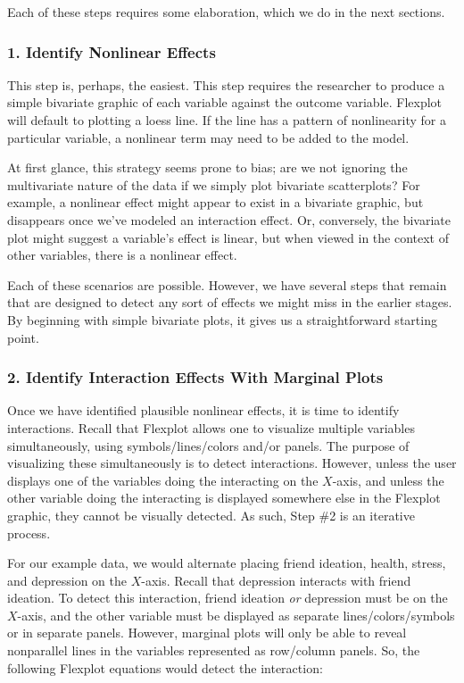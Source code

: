 \documentclass[
  man,floatsintext]{apa6}
\begin{document}
Each of these steps requires some elaboration, which we do in the next sections.

\subsubsection{1. Identify Nonlinear Effects}\label{identify-nonlinear-effects}

This step is, perhaps, the easiest. This step requires the researcher to produce a simple bivariate graphic of each variable against the outcome variable. Flexplot will default to plotting a loess line. If the line has a pattern of nonlinearity for a particular variable, a nonlinear term may need to be added to the model.

At first glance, this strategy seems prone to bias; are we not ignoring the multivariate nature of the data if we simply plot bivariate scatterplots? For example, a nonlinear effect might appear to exist in a bivariate graphic, but disappears once we've modeled an interaction effect. Or, conversely, the bivariate plot might suggest a variable's effect is linear, but when viewed in the context of other variables, there is a nonlinear effect.

Each of these scenarios are possible. However, we have several steps that remain that are designed to detect any sort of effects we might miss in the earlier stages. By beginning with simple bivariate plots, it gives us a straightforward starting point.

\subsubsection{2. Identify Interaction Effects With Marginal Plots}\label{identify-interaction-effects-with-marginal-plots}

Once we have identified plausible nonlinear effects, it is time to identify interactions. Recall that Flexplot allows one to visualize multiple variables simultaneously, using symbols/lines/colors and/or panels. The purpose of visualizing these simultaneously is to detect interactions. However, unless the user displays one of the variables doing the interacting on the \(X\)-axis, and unless the other variable doing the interacting is displayed somewhere else in the Flexplot graphic, they cannot be visually detected. As such, Step \#2 is an iterative process.

For our example data, we would alternate placing friend ideation, health, stress, and depression on the \(X\)-axis. Recall that depression interacts with friend ideation. To detect this interaction, friend ideation \emph{or} depression must be on the \(X\)-axis, and the other variable must be displayed as separate lines/colors/symbols or in separate panels. However, marginal plots will only be able to reveal nonparallel lines in the variables represented as row/column panels. So, the following Flexplot equations would detect the interaction:
\end{document}
